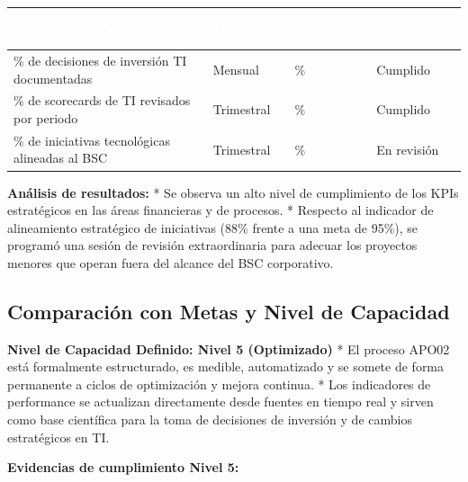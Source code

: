 \documentclass[11pt]{article}
\newcounter{none} %
\begin{document}
\vspace{0.3cm}
\setlength{\tabcolsep}{5pt}
\renewcommand{\arraystretch}{1.5}
{\def\LTcaptype{none}
\begin{longtable}[]{@{}
  >{\raggedright\arraybackslash}p{0.44\linewidth}
  >{\raggedright\arraybackslash}p{0.18\linewidth}
  >{\raggedright\arraybackslash}p{0.18\linewidth}
  >{\raggedright\arraybackslash}p{0.20\linewidth}@{}}
\rowcolor{DeepNavy}
\textcolor{white}{\textbf{Indicador de Proceso}} & \textcolor{white}{\textbf{Frecuencia}} & \textcolor{white}{\textbf{Valor Actual}} & \textcolor{white}{\textbf{Estado Operativo}} \\ \hline
\endhead
\rowcolor{LightGray}
\% de decisiones de inversión TI documentadas & Mensual & 98\% & Cumplido \\ \hline
\% de scorecards de TI revisados por periodo & Trimestral & 100\% & Cumplido \\ \hline
\rowcolor{LightGray}
\% de iniciativas tecnológicas alineadas al BSC & Trimestral & 88\% & En revisión \\ \hline
\end{longtable}
}

\textbf{Análisis de resultados:}
* Se observa un alto nivel de cumplimiento de los KPIs estratégicos en las áreas financieras y de procesos.
* Respecto al indicador de alineamiento estratégico de iniciativas (88\% frente a una meta de 95\%), se programó una sesión de revisión extraordinaria para adecuar los proyectos menores que operan fuera del alcance del BSC corporativo.

\subsection{Comparación con Metas y Nivel de Capacidad}
\textbf{Nivel de Capacidad Definido: Nivel 5 (Optimizado)}
* El proceso APO02 está formalmente estructurado, es medible, automatizado y se somete de forma permanente a ciclos de optimización y mejora continua.
* Los indicadores de performance se actualizan directamente desde fuentes en tiempo real y sirven como base científica para la toma de decisiones de inversión y de cambios estratégicos en TI.

\textbf{Evidencias de cumplimiento Nivel 5:}
\end{document}
